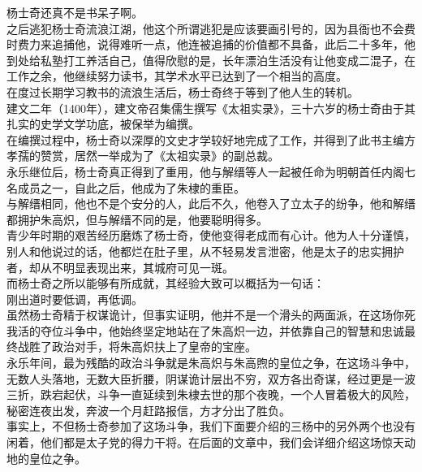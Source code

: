 \begin{multicols}{\theparacolNo}
杨士奇还真不是书呆子啊。\\

之后逃犯杨士奇流浪江湖，他这个所谓逃犯是应该要画引号的，因为县衙也不会费时费力来追捕他，说得难听一点，他连被追捕的价值都不具备，此后二十多年，他到处给私塾打工养活自己，值得欣慰的是，长年漂泊生活没有让他变成二混子，在工作之余，他继续努力读书，其学术水平已达到了一个相当的高度。\\

在度过长期学习教书的流浪生活后，杨士奇终于等到了他人生的转机。\\

建文二年（1400年），建文帝召集儒生撰写《太祖实录》，三十六岁的杨士奇由于其扎实的史学文学功底，被保举为编撰。\\

在编撰过程中，杨士奇以深厚的文史才学较好地完成了工作，并得到了此书主编方孝孺的赞赏，居然一举成为了《太祖实录》的副总裁。\\

永乐继位后，杨士奇真正得到了重用，他与解缙等人一起被任命为明朝首任内阁七名成员之一，自此之后，他成为了朱棣的重臣。\\

与解缙相同，他也不是个安分的人，此后不久，他卷入了立太子的纷争，他和解缙都拥护朱高炽，但与解缙不同的是，他要聪明得多。\\

青少年时期的艰苦经历磨炼了杨士奇，使他变得老成而有心计。他为人十分谨慎，别人和他说过的话，他都烂在肚子里，从不轻易发言泄密，他是太子的忠实拥护者，却从不明显表现出来，其城府可见一斑。\\

而杨士奇之所以能够有所成就，其经验大致可以概括为一句话：\\

刚出道时要低调，再低调。\\

虽然杨士奇精于权谋诡计，但事实证明，他并不是一个滑头的两面派，在这场你死我活的夺位斗争中，他始终坚定地站在了朱高炽一边，并依靠自己的智慧和忠诚最终战胜了政治对手，将朱高炽扶上了皇帝的宝座。\\

永乐年间，最为残酷的政治斗争就是朱高炽与朱高煦的皇位之争，在这场斗争中，无数人头落地，无数大臣折腰，阴谋诡计层出不穷，双方各出奇谋，经过更是一波三折，跌宕起伏，斗争一直延续到朱棣去世的那个夜晚，一个人冒着极大的风险，秘密连夜出发，奔波一个月赶路报信，方才分出了胜负。\\

事实上，不但杨士奇参加了这场斗争，我们下面要介绍的三杨中的另外两个也没有闲着，他们都是太子党的得力干将。在后面的文章中，我们会详细介绍这场惊天动地的皇位之争。\\


\end{multicols}
